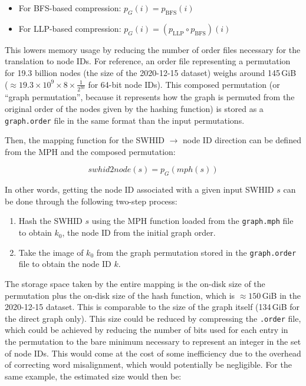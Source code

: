 \begin{itemize}
    \item For BFS-based compression: $p_G(i) = p_{\mathrm{BFS}}(i)$
    \item For LLP-based compression:
        $p_G(i) = (p_{\mathrm{LLP}} \circ p_{\mathrm{BFS}})(i)$
\end{itemize}

This lowers memory usage by reducing the number of order files necessary for
the translation to node IDs. For reference, an order file representing a
permutation for 19.3 billion nodes (the size of the 2020-12-15 dataset) weighs
around 145\,GiB ($\approx 19.3 \times 10^9 \times 8 \times \frac{1}{2^{30}}$
for 64-bit node IDs).
This composed permutation (or ``graph permutation'', because it represents how
the graph is permuted from the original order of the nodes given by the hashing
function) is stored as a \texttt{graph.order} file in the same format than the
input permutations.

Then, the mapping function for the \gls{SWHID} $\to$ node ID direction can be
defined from the \gls{MPH} and the composed permutation:

\[\mathit{swhid2node}(s) = p_G(\mathit{mph}(s))\]

In other words, getting the node ID associated with a given input \gls{SWHID}
$s$ can be done through the following two-step process:

\begin{enumerate}
    \item Hash the \gls{SWHID} $s$ using the \gls{MPH} function loaded from the
        \texttt{graph.mph} file to obtain $k_0$, the node ID from the initial
        graph order.
    \item Take the image of $k_0$ from the graph permutation stored in the
        \texttt{graph.order} file to obtain the node ID $k$.
\end{enumerate}

The storage space taken by the entire mapping is the on-disk size of the
permutation plus the on-disk size of the hash function, which is $\approx
150$\,GiB in the 2020-12-15 dataset. This is comparable to the size of the
graph itself (134\,GiB for the direct graph only). This size could be reduced
by compressing the \texttt{.order} file, which could be achieved by reducing
the number of bits used for each entry in the permutation to the bare minimum
necessary to represent an integer in the set of node IDs. This would come at
the cost of some inefficiency due to the overhead of correcting word
misalignment, which would potentially be negligible.
For the same example, the estimated size would then be:

